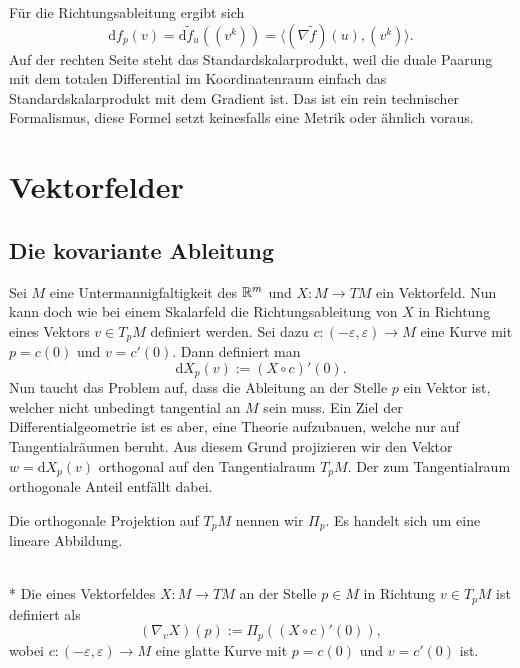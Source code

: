 Für die Richtungsableitung ergibt sich
\begin{equation}\label{eq:Richtungsableitung-lokal}
\mathrm df_p(v) = \mathrm d\tilde f_u((v^k)) =
\langle(\nabla \tilde f)(u),(v^k)\rangle.
\end{equation}
Auf der rechten Seite steht das Standardskalarprodukt, weil die
duale Paarung mit dem totalen Differential im Koordinatenraum einfach
das Standardskalarprodukt mit dem Gradient ist. Das ist ein rein
technischer Formalismus, diese Formel setzt keinesfalls eine
Metrik oder ähnlich voraus.


\section{Vektorfelder}

\subsection{Die kovariante Ableitung}

Sei $M$ eine Untermannigfaltigkeit des $\mathbb R^m$ und $X\colon M\to TM$
ein Vektorfeld. Nun kann doch wie bei einem Skalarfeld die
Richtungsableitung von $X$ in Richtung
eines Vektors $v\in T_p M$ definiert werden. Sei dazu
$c\colon (-\varepsilon,\varepsilon)\to M$ eine Kurve
mit $p=c(0)$ und $v=c'(0)$. Dann definiert man%
\begin{equation}
\mathrm dX_p(v) := (X\circ c)'(0).
\end{equation}
Nun taucht das Problem auf, dass die Ableitung an der Stelle $p$
ein Vektor ist, welcher nicht unbedingt tangential an $M$ sein muss.
Ein Ziel der Differentialgeometrie ist es aber, eine Theorie aufzubauen,
welche nur auf Tangentialräumen beruht. Aus diesem Grund projizieren
wir den Vektor $w=\mathrm dX_p(v)$ orthogonal auf den Tangentialraum
$T_p M$. Der zum Tangentialraum orthogonale Anteil entfällt dabei.

Die orthogonale Projektion auf $T_p M$ nennen wir $\Pi_p$. Es handelt
sich um eine lineare Abbildung.

\begin{definition}%
\mbox{}\\*
Die  eines Vektorfeldes $X\colon M\to TM$
an der Stelle $p\in M$ in Richtung $v\in T_p M$ ist definiert als
\begin{equation}
(\nabla_v X)(p) := \Pi_p((X\circ c)'(0)),
\end{equation}
wobei $c\colon (-\varepsilon,\varepsilon)\to M$ eine glatte Kurve
mit $p=c(0)$ und $v=c'(0)$ ist.
\end{definition}

